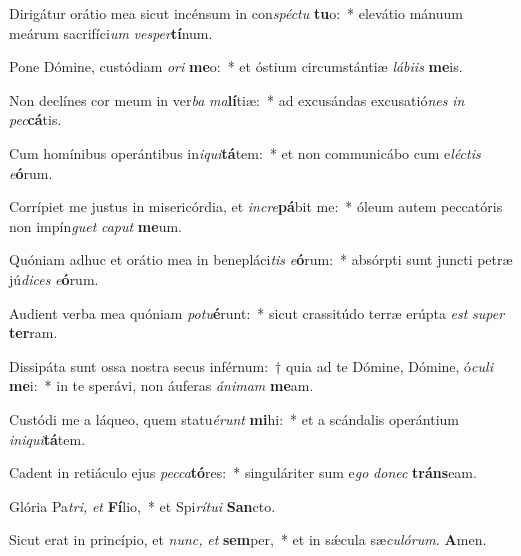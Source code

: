 \item Dirigátur orátio mea sicut incénsum in con\tinyhspace\textit{spéctu} \textbf{tu}o:~* elevátio mánuum meárum sacrifíci\tinyhspace\textit{um} \textit{vesper}\textbf{tí}num.
\item Pone Dómine, custódiam \textit{ori} \textbf{me}o:~* et óstium circumstántiæ \textit{lábiis} \textbf{me}is.
\item Non declínes cor meum in ver\textit{ba} \textit{ma}\textbf{lí}tiæ:~* ad excusándas excusatió\textit{nes} \textit{in} \textit{pec}\textbf{cá}tis.
\item Cum homínibus operántibus in\tinyhspace\textit{iqui}\textbf{tá}tem:~* et non communicábo cum e\tinyhspace\textit{léctis} \textit{e}\textbf{ó}rum.
\item Corrípiet me justus in misericórdia, et \textit{incre}\textbf{pá}bit me:~* óleum autem peccatóris non impín\textit{guet} \textit{caput} \textbf{me}um.
\item Quóniam adhuc et orátio mea in benepláci\textit{tis} \textit{e}\textbf{ó}rum:~* absórpti sunt jun\-cti petræ jú\textit{dices} \textit{e}\textbf{ó}rum.
\item Audient verba mea quóniam \textit{potu}\textbf{é}runt:~* sicut crassitúdo terræ erúpta \textit{est} \textit{super} \textbf{ter}ram.
\item Dissipáta sunt ossa nostra secus inférnum:~† quia ad te Dómine, Dómine, ó\textit{culi} \textbf{me}i:~* in te sperávi, non áuferas \textit{ánimam} \textbf{me}am.
\item Custódi me a láqueo, quem statu\textit{érunt} \textbf{mi}hi:~* et a scándalis operántium \textit{iniqui}\textbf{tá}tem.
\item Cadent in retiáculo ejus \textit{pecca}\textbf{tó}res:~* singuláriter sum e\textit{go} \textit{donec} \textbf{tráns}eam.
\item Glória Pa\tinyhspace\textit{tri,} \textit{et} \textbf{Fí}lio,~* et Spi\tinyhspace\textit{rítui} \textbf{San}cto.
\item Sicut erat in princípio, et \textit{nunc,} \textit{et} \textbf{sem}per,~* et in sǽcula sæ\tinyhspace\textit{culórum.} \textbf{A}men.